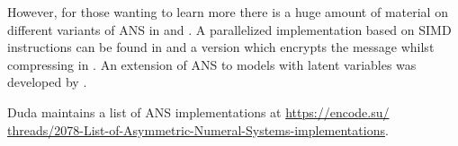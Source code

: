 \documentclass{article}
\theoremstyle{definition}
\begin{document}
However, for those wanting to learn more there is a huge amount of material on
different variants of ANS in \citet{duda2009} and \citet{duda2015}. A
parallelized implementation based on SIMD instructions can be found in
\citet{giesen2014} and a version which encrypts the message whilst compressing
in \citet{duda2016}.  An extension of ANS to models with latent variables was
developed by \citet{townsend2019}.

Duda maintains a list of ANS implementations at
\url{
  https://encode.su/
  threads/2078-List-of-Asymmetric-Numeral-Systems-implementations}.
\printbibliography
\end{document}
